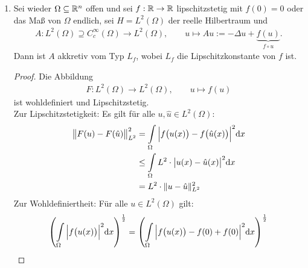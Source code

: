 \begin{beispiel}
\begin{enumerate}[label=(\alph*)]
		\begin{proof}
			\begin{align*}
				&\forall (u,v),(\hat{u},\hat{v})\in A,\forall\lambda>0:
				\big[u-\hat{u},v-\hat{v}+F(u)-F(\hat{u})\big]_\lambda
				+(\omega+L)\cdot\Vert u-\hat{u}\Vert\\
				&=\frac{\Big\Vert u-\hat{u}+\lambda\cdot\big(v-\hat{v}+F(u)-F(\hat{u})\big)\Big\Vert-\Vert u-\hat{u}\Vert}{\lambda}
				+(\omega+L)\cdot\Vert u-\hat{u}\Vert\\
				\overset{\Delta\text{-Ungl}}&{\geq}
				\frac{\big\Vert u-\hat{u}+\lambda\cdot(v-\hat{v})\big\Vert-\Vert u-\hat{u}\Vert}{\lambda}\underbrace{-\big\Vert F(u)-F(\hat{u})\big\Vert}_{\geq -L\cdot\Vert u-\hat{u}\Vert}
				+(\omega+L)\cdot\Vert u-\hat{u}\Vert\\
				&\geq0
			\end{align*}
		\end{proof}
		\item Sei wieder $\Omega\subseteq\mathbb{R}^n$ offen und sei $f:\mathbb{R}\to\mathbb{R}$ lipschitzstetig mit $f(0)=0$ oder das Maß von $\Omega$ endlich, 
		sei $H=L^2(\Omega)$ der reelle Hilbertraum und
		\begin{align*}
			A:L^2(\Omega)\supseteq C_c^\infty(\Omega)\to L^2(\Omega),\qquad
			u\mapsto Au:=-\Delta u+\underbrace{f(u)}_{f\circ u}.
		\end{align*}
		Dann ist $A$ akkretiv vom Typ $L_f$, wobei $L_f$ die Lipschitzkonstante von $f$ ist.
		\begin{proof}
			Die Abbildung
			\begin{align*}
				F: L^2(\Omega)\to L^2(\Omega),\qquad u\mapsto f(u)
			\end{align*}
			ist wohldefiniert und Lipschitzstetig.\\
			Zur Lipschitzstetigkeit: Es gilt für alle $u,\hat{u}\in L^2(\Omega)$:
			\begin{align*}
				\big\Vert F(u)-F(\hat{u})\big\Vert^2_{L^2}
				&=\int\limits_\Omega\Big|f\big(u(x)\big)-f\big(\hat{u}(x)\big)\Big|^2\mathrm{d} x\\
				&\leq
				\int\limits_\Omega L^2\cdot\big|u(x)-\hat{u}(x)\big|^2\mathrm{d} x\\
				&=L^2\cdot\Vert u-\hat{u}\Vert^2_{L^2}
			\end{align*}
			Zur Wohldefiniertheit: Für alle $u\in L^2(\Omega)$ gilt:
			\begin{align*}
				\left(\int\limits_\Omega\Big|f\big(u(x)\big)\Big|^2\d x\right)^{\frac{1}{2}}
				&=\left(\int\limits_\Omega\Big|f\big(u(x)\big)-f(0)+f(0)\Big|^2\d x\right)^{\frac{1}{2}}\\

\end{align*}
\end{proof}
\end{enumerate}
\end{beispiel}
